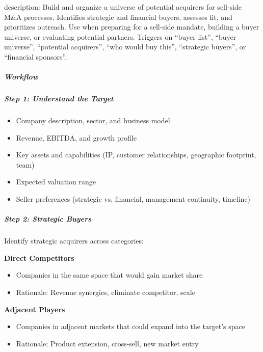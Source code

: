 \documentclass[11pt]{article}
\begin{document}
description: Build and organize a universe of potential acquirers for sell-side M\&A processes. Identifies strategic and financial buyers, assesses fit, and prioritizes outreach. Use when preparing for a sell-side mandate, building a buyer universe, or evaluating potential partners. Triggers on ``buyer list'', ``buyer universe'', ``potential acquirers'', ``who would buy this'', ``strategic buyers'', or ``financial sponsors''.


\subparagraph{Workflow}\mbox{}\par

\subparagraph{Step 1: Understand the Target}\mbox{}\par

\begin{itemize}[leftmargin=*,itemsep=2pt,topsep=2pt]
\item {} Company description, sector, and business model
\item {} Revenue, EBITDA, and growth profile
\item {} Key assets and capabilities (IP, customer relationships, geographic footprint, team)
\item {} Expected valuation range
\item {} Seller preferences (strategic vs. financial, management continuity, timeline)
\end{itemize}

\subparagraph{Step 2: Strategic Buyers}\mbox{}\par

Identify strategic acquirers across categories:


\textbf{Direct Competitors}

\begin{itemize}[leftmargin=*,itemsep=2pt,topsep=2pt]
\item {} Companies in the same space that would gain market share
\item {} Rationale: Revenue synergies, eliminate competitor, scale
\end{itemize}

\textbf{Adjacent Players}

\begin{itemize}[leftmargin=*,itemsep=2pt,topsep=2pt]
\item {} Companies in adjacent markets that could expand into the target's space
\item {} Rationale: Product extension, cross-sell, new market entry
\end{itemize}
\end{document}
